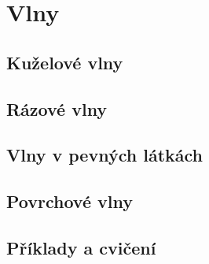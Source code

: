 \chapter{Vlny}\label{fyz:IchapLI}
\minitoc
  \section{Kuželové vlny}\label{fyz:IchapLIsecI}
  \section{Rázové vlny}\label{fyz:IchapLIsecII}
  \section{Vlny v pevných látkách}\label{fyz:IchapLIsecIII}
  \section{Povrchové vlny}\label{fyz:IchapLIsecIV}
  \section{Příklady a cvičení}\label{fyz:IchapLIsecVI}